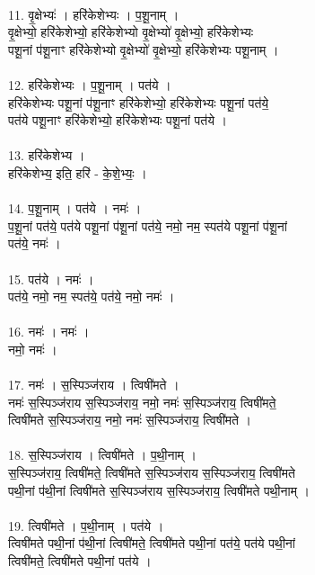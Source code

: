 \\
11. वृ॒क्षेभ्यः॑ । हरि॑केशेभ्यः । प॒शू॒नाम् ।\\
वृ॒क्षेभ्यो॒ हरि॑केशेभ्यो॒ हरि॑केशेभ्यो वृ॒क्षेभ्यो॑ वृ॒क्षेभ्यो॒ हरि॑केशेभ्यः\\
पशू॒नां प॑शू॒नाꣳ हरि॑केशेभ्यो वृ॒क्षेभ्यो॑ वृ॒क्षेभ्यो॒ हरि॑केशेभ्यः पशू॒नाम् ।\\
\\
12. हरि॑केशेभ्यः । प॒शू॒नाम् । पत॑ये ।\\
हरि॑केशेभ्यः पशू॒नां प॑शू॒नाꣳ हरि॑केशेभ्यो॒ हरि॑केशेभ्यः पशू॒नां पत॑ये॒\\
पत॑ये पशू॒नाꣳ हरि॑केशेभ्यो॒ हरि॑केशेभ्यः पशू॒नां पत॑ये ।\\
\\
13. हरि॑केशेभ्य ।\\
हरि॑केशेभ्य॒ इति॒ हरि॑ - के॒शे॒भ्यः॒ ।\\
\\
14. प॒शू॒नाम् । पत॑ये । नमः॑ ।\\
प॒शू॒नां पत॑ये॒ पत॑ये पशू॒नां प॑शू॒नां पत॑ये॒ नमो॒ नम॒ स्पत॑ये पशू॒नां प॑शू॒नां\\
पत॑ये॒ नमः॑ ।\\
\\
15. पत॑ये । नमः॑ ।\\
पत॑ये॒ नमो॒ नम॒ स्पत॑ये॒ पत॑ये॒ नमो॒ नमः॑ ।\\
\\
16. नमः॑ । नमः॑ ।\\
नमो॒ नमः॑ ।\\
\\
17. नमः॑ । स॒स्पिञ्ज॑राय । त्विषी॑मते ।\\
नमः॑ स॒स्पिञ्ज॑राय स॒स्पिञ्ज॑राय॒ नमो॒ नमः॑ स॒स्पिञ्ज॑राय॒ त्विषी॑मते॒\\
त्विषी॑मते स॒स्पिञ्ज॑राय॒ नमो॒ नमः॑ स॒स्पिञ्ज॑राय॒ त्विषी॑मते ।\\
\\
18. स॒स्पिञ्ज॑राय । त्विषी॑मते । प॒थी॒नाम् ।\\
स॒स्पिञ्ज॑राय॒ त्विषी॑मते॒ त्विषी॑मते स॒स्पिञ्ज॑राय स॒स्पिञ्ज॑राय॒ त्विषी॑मते\\
पथी॒नां प॑थी॒नां त्विषी॑मते स॒स्पिञ्ज॑राय स॒स्पिञ्ज॑राय॒ त्विषी॑मते पथी॒नाम् ।\\
\\
19. त्विषी॑मते । प॒थी॒नाम् । पत॑ये ।\\
त्विषी॑मते पथी॒नां प॑थी॒नां त्विषी॑मते॒ त्विषी॑मते पथी॒नां पत॑ये॒ पत॑ये पथी॒नां\\
त्विषी॑मते॒ त्विषी॑मते पथी॒नां पत॑ये ।\\
\\
